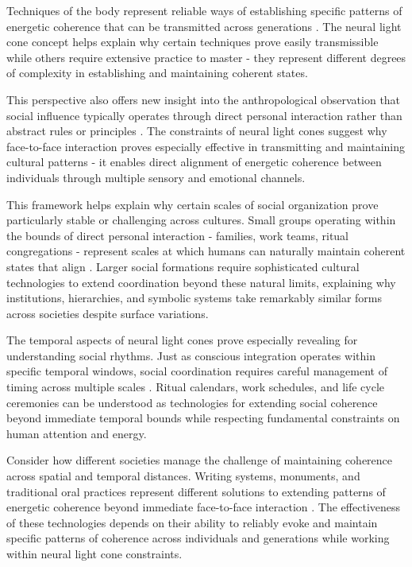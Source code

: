 Techniques of the body represent reliable ways of establishing specific patterns of energetic coherence that can be transmitted across generations \cite{mauss1973techniques}. The neural light cone concept helps explain why certain techniques prove easily transmissible while others require extensive practice to master - they represent different degrees of complexity in establishing and maintaining coherent states.

This perspective also offers new insight into the anthropological observation that social influence typically operates through direct personal interaction rather than abstract rules or principles \cite{goffman1967interaction}. The constraints of neural light cones suggest why face-to-face interaction proves especially effective in transmitting and maintaining cultural patterns - it enables direct alignment of energetic coherence between individuals through multiple sensory and emotional channels.

This framework helps explain why certain scales of social organization prove particularly stable or challenging across cultures. Small groups operating within the bounds of direct personal interaction - families, work teams, ritual congregations - represent scales at which humans can naturally maintain coherent states that align \cite{hutchins1995cognition}. Larger social formations require sophisticated cultural technologies to extend coordination beyond these natural limits, explaining why institutions, hierarchies, and symbolic systems take remarkably similar forms across societies despite surface variations.

The temporal aspects of neural light cones prove especially revealing for understanding social rhythms. Just as conscious integration operates within specific temporal windows, social coordination requires careful management of timing across multiple scales \cite{mcneill1995keeping}. Ritual calendars, work schedules, and life cycle ceremonies can be understood as technologies for extending social coherence beyond immediate temporal bounds while respecting fundamental constraints on human attention and energy.

Consider how different societies manage the challenge of maintaining coherence across spatial and temporal distances. Writing systems, monuments, and traditional oral practices represent different solutions to extending patterns of energetic coherence beyond immediate face-to-face interaction \cite{thompson2001radical}. The effectiveness of these technologies depends on their ability to reliably evoke and maintain specific patterns of coherence across individuals and generations while working within neural light cone constraints.


